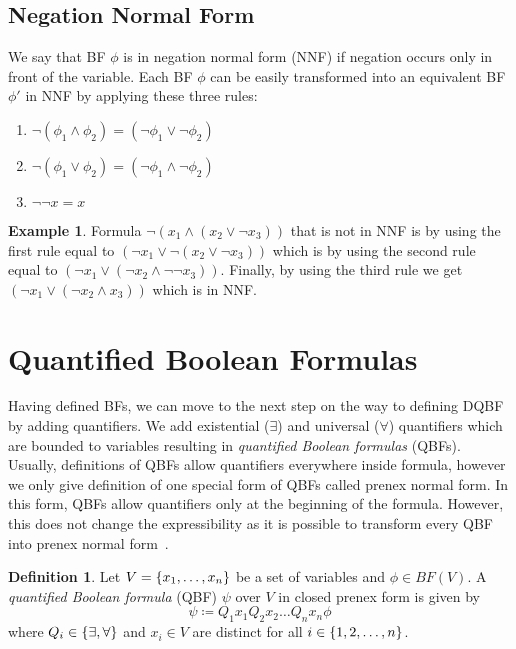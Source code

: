 \documentclass[
  digital, %
  twoside, %
  table,   %
  nolof,     %
  nolot,     %
]{fithesis3}
\let\setbuilder\set
\newcommand{\simpleset}[1]{\{{#1}\}}
\renewcommand{\set}[1]{\normalexpandarg\IfSubStr{#1}{|}{\setbuilder{#1}}{\simpleset{#1}}}
\theoremstyle{definition}
\newtheorem{definition}{Definition}
\newtheorem{example}{Example}
\theoremstyle{remark}
\newcommand{\BF}[1]{BF(#1)}
\begin{document}
\subsection{Negation Normal Form}
\label{sec:BF:NNF}
We say that BF $\phi$ is in negation normal form (NNF) if negation occurs only in front of the variable. Each BF $\phi$ can be easily transformed into an equivalent BF $\phi'$ in NNF by applying these three rules:
\begin{enumerate}
    \item $\neg(\phi_1 \land \phi_2) = (\neg\phi_1 \lor \neg\phi_2)$ 
    \item $\neg(\phi_1 \lor \phi_2) = (\neg\phi_1 \land \neg\phi_2)$
    \item $\neg\neg x = x$
\end{enumerate}
\begin{example}
Formula $\neg (x_1 \land (x_2 \lor \neg x_3))$ that is not in NNF is by using the first rule equal to $(\neg x_1 \lor \neg(x_2 \lor \neg x_3))$ which is by using the second rule equal to $(\neg x_1 \lor (\neg x_2 \land \neg\neg x_3))$. Finally, by using the third rule we get $(\neg x_1 \lor (\neg x_2 \land x_3))$ which is in NNF.
\end{example}

\section{Quantified Boolean Formulas}
Having defined BFs, we can move to the next step on the way to defining DQBF by adding quantifiers. We add existential (${\exists}$) and universal (${\forall}$) quantifiers which are bounded to variables resulting in \emph{quantified Boolean formulas} (QBFs). Usually, definitions of QBFs allow quantifiers everywhere inside formula, however we only give definition of one special form of QBFs called prenex normal form. In this form, QBFs allow quantifiers only at the beginning of the formula. However, this does not change the expressibility as it is possible to transform every QBF into prenex normal form~\cite{prenexingQBFs}.

\begin{definition}
Let $V = \set{x_1,\dots,x_n}$ be a set of variables and $\phi \in \BF{V}$. A \emph{quantified Boolean formula} (QBF) $\psi$ over $V$ in closed prenex form is given by
\[\psi \coloneqq Q_1 x_1 Q_2 x_2 \dots Q_n x_n \phi\]
where $Q_i \in \set{{\exists}, {\forall}}$ and $x_i \in V$ are distinct for all $i \in \set{1,2,\dots,n}$.
\label{def:QBF}
\end{definition}
\end{document}
